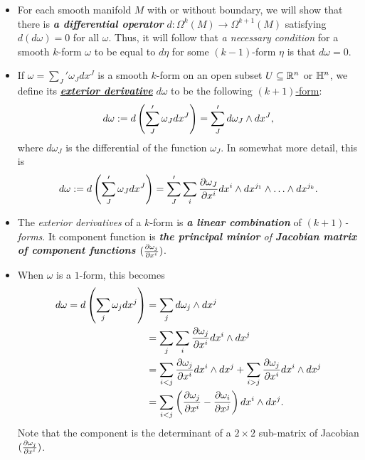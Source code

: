 \documentclass[11pt]{article}
\begin{document}
\begin{itemize}
\item \begin{remark}
For each smooth manifold $M$ with or without boundary, we will show that there is \emph{\textbf{a differential operator}} $d: \Omega^k(M) \rightarrow \Omega^{k+1}(M)$ satisfying $d(d\omega) = 0$ for all $\omega$.  Thus, it will follow that \emph{a necessary condition} for a smooth
$k$-form $\omega$ to be equal to $d\eta$ for some $(k-1)$-form $\eta$ is that $d\omega = 0$.
\end{remark}

\item \begin{definition}
If $\omega = \sum_{J}'\omega_J dx^J$ is a smooth $k$-form on an open subset $U\subseteq {\mathbb R}^n$ or ${\mathbb H}^n$, we define its \underline{\emph{\textbf{exterior derivative}}} $d\omega$ to be the following \underline{$(k+1)$-form}:
\begin{align}
d\omega := d\left(\sum_{J}'\omega_J dx^J\right) =\sum_{J}' d\omega_J \wedge dx^{J},  \label{eqn: exterior_derivatives_def_0}
\end{align}
where $d\omega_J$ is the differential of the function $\omega_J$. In somewhat more detail, this is
\begin{align}
d\omega := d\left(\sum_{J}'\omega_J dx^J\right) = \sum_{J}'\sum_{i}\frac{\partial \omega_{J}}{ \partial x^i} dx^i \wedge dx^{j_1} \wedge \ldots \wedge dx^{j_k}. \label{eqn: exterior_derivatives_def_1}
\end{align}
\end{definition}

\item \begin{remark}
The \emph{exterior derivatives} of a $k$-form is \emph{\textbf{a linear combination}} of \emph{$(k+1)$-forms}. It component function is  \emph{\textbf{the principal minior} of \textbf{Jacobian matrix of component functions} $(\frac{\partial \omega_j}{ \partial x^i})$}.
\end{remark}

\item \begin{remark}
When $\omega$ is a $1$-form, this becomes
\begin{align*}
d\omega = d\left(\sum_{j}\omega_j dx^j\right) &= \sum_j d\omega_j \wedge dx^{j}\\
&= \sum_j \sum_{i}\frac{\partial \omega_j}{ \partial x^i} dx^i \wedge dx^{j} \\
&= \sum_{i < j} \frac{\partial \omega_j}{ \partial x^i} dx^i \wedge dx^{j} + \sum_{i > j}\frac{\partial \omega_j}{ \partial x^i} dx^i \wedge dx^{j}\\
&= \sum_{i < j}\left(\frac{\partial \omega_j}{ \partial x^i}  - \frac{\partial \omega_i}{ \partial x^j}\right)dx^i \wedge dx^{j}.
\end{align*} Note that the component is the determinant of a $2 \times 2$ sub-matrix of Jacobian $(\frac{\partial \omega_j}{ \partial x^i})$.
\end{remark}


\end{itemize}
\end{document}
